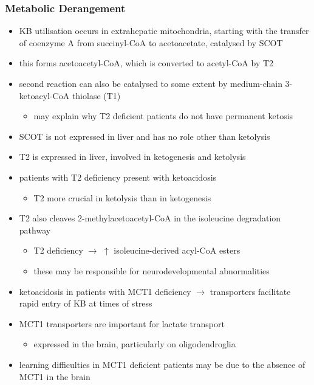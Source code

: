 \documentclass[12pt]{scrartcl}
\begin{document}
\subsubsection{Metabolic Derangement}
\label{sec:orgabab382}
\begin{itemize}
\item KB utilisation occurs in extrahepatic mitochondria, starting with
the transfer of coenzyme A from succinyl-CoA to acetoacetate,
catalysed by SCOT


\item this forms acetoacetyl-CoA, which is converted to acetyl-CoA by T2
\item second reaction can also be catalysed to some extent by
medium-chain 3-ketoacyl-CoA thiolase (T1)
\begin{itemize}
\item may explain why T2 deficient patients do not have permanent
ketosis
\end{itemize}

\item SCOT is not expressed in liver and has no role other than
ketolysis
\item T2 is expressed in liver, involved in ketogenesis and ketolysis
\item patients with T2 deficiency present with ketoacidosis
\begin{itemize}
\item T2 more crucial in ketolysis than in ketogenesis
\end{itemize}
\item T2 also cleaves 2-methylacetoacetyl-CoA in the isoleucine
degradation pathway
\begin{itemize}
\item T2 deficiency \(\to\) \(\uparrow\) isoleucine-derived acyl-CoA esters
\item these may be responsible for neurodevelopmental abnormalities
\end{itemize}
\item ketoacidosis in patients with MCT1 deficiency \(\to\) transporters
facilitate rapid entry of KB at times of stress
\item MCT1 transporters are important for lactate transport
\begin{itemize}
\item expressed in the brain, particularly on oligodendroglia
\end{itemize}
\item learning difficulties in MCT1 deficient patients may be due to the
absence of MCT1 in the brain
\end{itemize}
\end{document}
